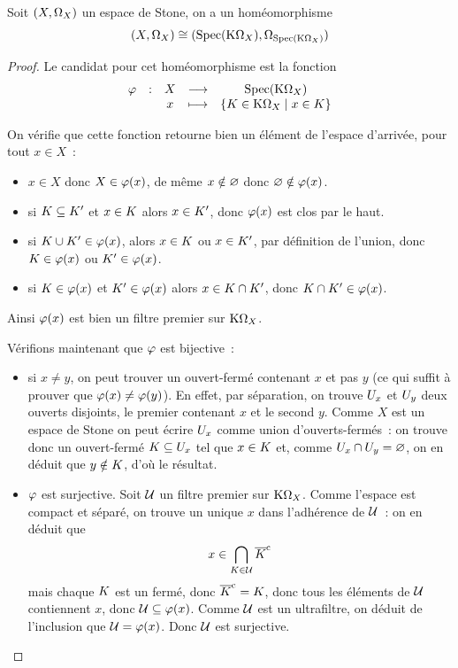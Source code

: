 \begin{lemma}
  Soit $(X,\Omega_{X})$ un espace de Stone, on a un homéomorphisme
  \[(X,\Omega_{X})\cong (\operatorname{Spec}(\mathrm{K}\Omega_{X}),\Omega_{\operatorname{Spec}(\mathrm{K}\Omega_{X})})\]
\end{lemma}

\begin{proof}
  Le candidat pour cet homéomorphisme est la fonction
  \[
  \makeFun{\isoSt}{X}{\Spec(\Comp{\topoP{X}})}{x}
          {\compr{\varCK\in \Comp{\topoP{X}}}{x\in \varCK}}
  \]

  On vérifie que cette fonction retourne bien un élément de l'espace d'arrivée,
  pour tout $x\in X$~:
  \begin{itemize}
  \item $x\in X$ donc $X\in \varphi(x)$, de même $x\notin\varnothing$ donc
    $\varnothing\notin\varphi(x)$.
  \item si $K\subseteq K'$ et $x\in K$ alors $x\in K'$,
    donc $\varphi(x)$ est clos par le haut.
  \item si $K\cup K' \in \varphi(x)$, alors $x\in K$ ou
    $x\in K'$, par définition de l'union, donc $K\in\varphi(x)$ ou
    $K'\in\varphi(x)$.
  \item si $K\in\varphi(x)$ et $K'\in\varphi(x)$ alors
    $x\in K\cap K'$, donc $K\cap K'\in\varphi(x)$.
  \end{itemize}
  Ainsi $\varphi(x)$ est bien un filtre premier sur $\mathrm{K}\Omega_{X}$.

  Vérifions maintenant que $\varphi$ est bijective~:
  \begin{itemize}
  \item si $x\neq y$, on peut trouver un ouvert-fermé contenant $x$ et pas $y$
    (ce qui suffit à prouver que $\varphi(x)\neq\varphi(y)$). En effet, par
    séparation, on trouve $U_x$ et $U_y$ deux ouverts disjoints, le
    premier contenant $x$ et le second $y$. Comme $X$ est un espace de Stone on
    peut écrire $U_x$ comme union d'ouverts-fermés~: on trouve donc un
    ouvert-fermé $K\subseteq U_x$ tel que $x\in K$ et, comme
    $U_x\cap U_y=\varnothing$, on en déduit que $y\notin K$, d'où le
    résultat.
  \item $\varphi$ est surjective. Soit $\mathcal{U}$ un filtre premier sur
    $\mathrm{K}\Omega_{X}$. Comme l'espace est compact et séparé, on trouve un
    unique $x$ dans l'adhérence de $\mathcal{U}$~: on en déduit que
    \[x\in\bigcap_{K\in \mathcal{U}}\overline{K}^{\mathrm c}\]
    mais chaque $K$ est un fermé, donc $\overline{K}^{\mathrm c} = K$, donc tous
    les éléments de $\mathcal{U}$ contiennent $x$, donc
    $\mathcal{U}\subseteq \varphi(x)$.
    Comme $\mathcal{U}$ est un ultrafiltre, on déduit de l'inclusion que
    $\mathcal{U} = \varphi(x)$. Donc $\mathcal{U}$ est surjective.
  \end{itemize}


\end{proof}
